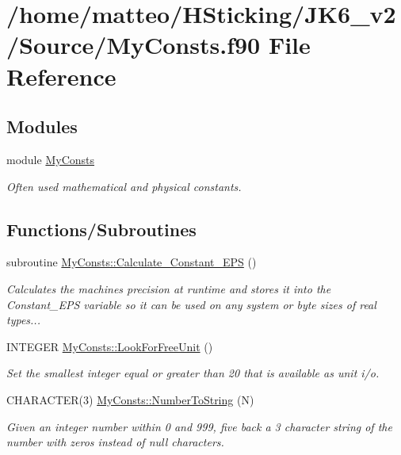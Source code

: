 \hypertarget{_my_consts_8f90}{
\section{/home/matteo/HSticking/JK6\_\-v2/Source/MyConsts.f90 File Reference}
\label{_my_consts_8f90}
}
\subsection*{Modules}
\begin{DoxyCompactItemize}
\item 
module \hyperlink{namespace_my_consts}{MyConsts}


\begin{DoxyCompactList}\small\item\em Often used mathematical and physical constants. \item\end{DoxyCompactList}\end{DoxyCompactItemize}
\subsection*{Functions/Subroutines}
\begin{DoxyCompactItemize}
\item 
subroutine \hyperlink{namespace_my_consts_a30010b124d6326386412e65f9673b934}{MyConsts::Calculate\_\-Constant\_\-EPS} ()
\begin{DoxyCompactList}\small\item\em Calculates the machines precision at runtime and stores it into the Constant\_\-EPS variable so it can be used on any system or byte sizes of real types... \item\end{DoxyCompactList}\item 
INTEGER \hyperlink{namespace_my_consts_a093b1ea96b1aa71b483171f830362952}{MyConsts::LookForFreeUnit} ()
\begin{DoxyCompactList}\small\item\em Set the smallest integer equal or greater than 20 that is available as unit i/o. \item\end{DoxyCompactList}\item 
CHARACTER(3) \hyperlink{namespace_my_consts_a48c07e594adf4fa6121bcd79c799145b}{MyConsts::NumberToString} (N)
\begin{DoxyCompactList}\small\item\em Given an integer number within 0 and 999, five back a 3 character string of the number with zeros instead of null characters. \item\end{DoxyCompactList}\end{DoxyCompactItemize}
